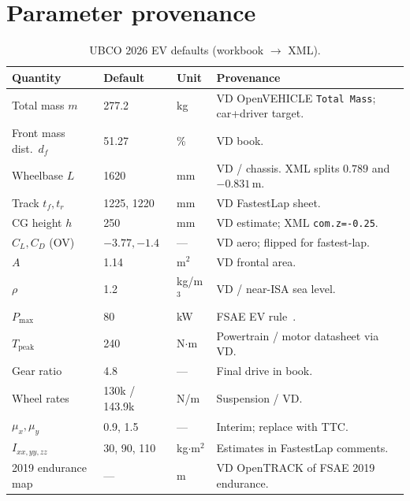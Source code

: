 \documentclass[11pt,letterpaper]{article}
\begin{document}
\section{Parameter provenance}
\label{sec:numbers}

\begin{table}[ht]
\centering
\caption{UBCO 2026 EV defaults (workbook $\to$ XML).}
\scriptsize
\begin{tabular}{@{}llll@{}}
\toprule
Quantity                 & Default        & Unit        & Provenance \\
\midrule
Total mass $m$           & 277.2          & kg          & VD OpenVEHICLE \texttt{Total Mass}; car+driver target. \\
Front mass dist.\ $d_f$  & 51.27          & \%          & VD book. \\
Wheelbase $L$            & 1620           & mm          & VD / chassis. XML splits $0.789$ and $-0.831$\,m. \\
Track $t_f,t_r$          & 1225, 1220     & mm          & VD FastestLap sheet. \\
CG height $h$            & 250            & mm          & VD estimate; XML \texttt{com.z=-0.25}. \\
$C_L,C_D$ (OV)           & $-3.77,-1.4$   & ---         & VD aero; flipped for fastest-lap. \\
$A$                      & 1.14           & m$^2$       & VD frontal area. \\
$\rho$                   & 1.2            & kg/m$^3$    & VD / near-ISA sea level. \\
$P_{\max}$               & 80             & kW          & FSAE EV rule~\cite{fsae-rules}. \\
$T_{\mathrm{peak}}$      & 240            & N$\cdot$m   & Powertrain / motor datasheet via VD. \\
Gear ratio                & 4.8            & ---         & Final drive in book. \\
Wheel rates               & 130k / 143.9k  & N/m         & Suspension / VD. \\
$\mu_x,\mu_y$            & 0.9, 1.5       & ---         & Interim; replace with TTC. \\
$I_{xx,yy,zz}$           & 30, 90, 110    & kg$\cdot$m$^2$ & Estimates in FastestLap comments. \\
2019 endurance map        & ---            & m           & VD OpenTRACK of FSAE 2019 endurance. \\
\bottomrule
\end{tabular}
\end{table}
\end{document}
